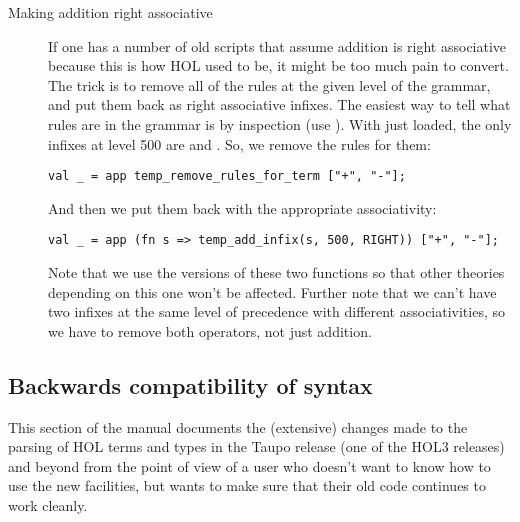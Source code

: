 {\begin{description}
\item[Making addition right associative] If one has a number of old
  scripts that assume addition is right associative because this is
  how HOL used to be, it might be too much pain to convert.  The trick
  is to remove all of the rules at the given level of the grammar, and
  put them back as right associative infixes.  The easiest way to tell
  what rules are in the grammar is by inspection (use
  ).  With just 
  loaded, the only infixes at level 500 are \holtxt{+} and
  \holtxt{-}.  So, we remove the rules for them:
\begin{verbatim}
val _ = app temp_remove_rules_for_term ["+", "-"];
\end{verbatim}
  \noindent And then we put them back with the appropriate
  associativity:
\begin{verbatim}
val _ = app (fn s => temp_add_infix(s, 500, RIGHT)) ["+", "-"];
\end{verbatim}
\noindent Note that we use the  versions of these two
functions so that other theories depending on this one won't be
affected.  Further note that we can't have two infixes at the same
level of precedence with different associativities, so we have to
remove both operators, not just addition.

\end{description}

}

\subsection{Backwards compatibility of syntax}

This section of the manual documents the (extensive) changes made to
the parsing of HOL terms and types in the Taupo release (one of the
HOL3 releases) and beyond from the point of view of a user who doesn't
want to know how to use the new facilities, but wants to make sure
that their old code continues to work cleanly.

